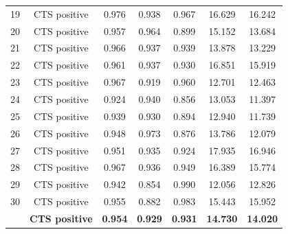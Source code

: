 \begin{table}[H]
{\begin{tabular}{ccccccc}
\hline
19 & CTS positive & 0.976 & 0.938 & 0.967 & 16.629 & 16.242 \\
20 & CTS positive & 0.957 & 0.964 & 0.899 & 15.152 & 13.684 \\
21 & CTS positive & 0.966 & 0.937 & 0.939 & 13.878 & 13.229 \\
22 & CTS positive & 0.961 & 0.937 & 0.930 & 16.851 & 15.919 \\
23 & CTS positive & 0.967 & 0.919 & 0.960 & 12.701 & 12.463 \\
24 & CTS positive & 0.924 & 0.940 & 0.856 & 13.053 & 11.397 \\
25 & CTS positive & 0.939 & 0.930 & 0.894 & 12.940 & 11.739 \\
26 & CTS positive & 0.948 & 0.973 & 0.876 & 13.786 & 12.079 \\
27 & CTS positive & 0.951 & 0.935 & 0.924 & 17.935 & 16.946 \\
28 & CTS positive & 0.967 & 0.936 & 0.949 & 16.389 & 15.774 \\
29 & CTS positive & 0.942 & 0.854 & 0.990 & 12.056 & 12.826 \\
30 & CTS positive & 0.955 & 0.882 & 0.983 & 15.443 & 15.952 \\
\hline
& \textbf{CTS positive} & \textbf{0.954} & \textbf{0.929} & \textbf{0.931} & \textbf{14.730} & \textbf{14.020} \\
\hline
\end{tabular}}
\label{tab:clinical_evaluation}
\end{table}



 









